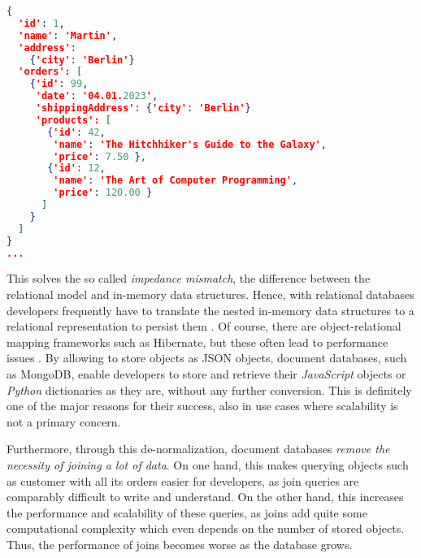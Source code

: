\begin{lstlisting}[language=JSON, caption=Document Database -- Data as Nested JSON Document, captionpos=b, label=lst:SalesDataJSONDocument]
{
  'id': 1,
  'name': 'Martin',
  'address': 
    {'city': 'Berlin'}
  'orders': [
    {'id': 99,
     'date': '04.01.2023',
     'shippingAddress': {'city': 'Berlin'}
     'products': [
       {'id': 42,
        'name': 'The Hitchhiker's Guide to the Galaxy',
        'price': 7.50 },
       {'id': 12,
        'name': 'The Art of Computer Programming',
        'price': 120.00 }
      ]
    }
  ]
}
...
\end{lstlisting}


This solves the so called \emph{impedance mismatch}, the difference between the relational model and in-memory data structures. Hence, with relational databases developers frequently have to translate the nested in-memory data structures to a relational representation to persist them \cite{NoSQLDistilled}. Of course, there are object-relational mapping frameworks such as Hibernate, but these often lead to performance issues \cite{NoSQLDistilled}. By allowing to store objects as JSON objects, document databases, such as MongoDB, enable developers to store and retrieve their \emph{JavaScript} objects or \emph{Python} dictionaries as they are, without any further conversion. This is definitely one of the major reasons for their success, also in use cases where scalability is not a primary concern.\par
Furthermore, through this de-normalization, document databases \emph{remove the necessity of joining a lot of data}. On one hand, this makes querying objects such as customer with all its orders easier for developers, as join queries are comparably difficult to write and understand. On the other hand, this increases the performance and scalability of these queries, as joins add quite some computational complexity which even depends on the number of stored objects. Thus, the performance of joins becomes worse as the database grows.\par

